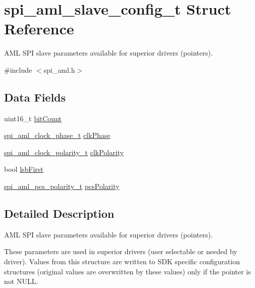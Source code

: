 \hypertarget{structspi__aml__slave__config__t}{}\section{spi\+\_\+aml\+\_\+slave\+\_\+config\+\_\+t Struct Reference}
\label{structspi__aml__slave__config__t}


A\+ML S\+PI slave parameters available for superior drivers (pointers).  




{\ttfamily \#include $<$spi\+\_\+aml.\+h$>$}

\subsection*{Data Fields}
\begin{DoxyCompactItemize}
\item 
uint16\+\_\+t \mbox{\hyperlink{structspi__aml__slave__config__t_afcc9f66e274f7e690549d5d216970d73}{bit\+Count}}
\item 
\mbox{\hyperlink{group__enum__group_gaa95bcc4aa184cc2df42df55e6d8c2d3a}{spi\+\_\+aml\+\_\+clock\+\_\+phase\+\_\+t}} \mbox{\hyperlink{structspi__aml__slave__config__t_a8369385e8658ba5c7a74897397ce0a85}{clk\+Phase}}
\item 
\mbox{\hyperlink{group__enum__group_ga846bf859b73b0a584889013e680bdc5f}{spi\+\_\+aml\+\_\+clock\+\_\+polarity\+\_\+t}} \mbox{\hyperlink{structspi__aml__slave__config__t_a732dd1442ee0b3aa8d353fcd9d84a99f}{clk\+Polarity}}
\item 
bool \mbox{\hyperlink{structspi__aml__slave__config__t_af684ebd7127978006da4f66fd4b1bf9a}{lsb\+First}}
\item 
\mbox{\hyperlink{group__enum__group_ga376ab165389ceb9a6e3f763263ff7e06}{spi\+\_\+aml\+\_\+pcs\+\_\+polarity\+\_\+t}} \mbox{\hyperlink{structspi__aml__slave__config__t_a5ab3ca2262578bfbad4d009e8c12d416}{pcs\+Polarity}}
\end{DoxyCompactItemize}


\subsection{Detailed Description}
A\+ML S\+PI slave parameters available for superior drivers (pointers). 

These parameters are used in superior drivers (user selectable or needed by driver). Values from this structure are written to S\+DK specific configuration structures (original values are overwritten by these values) only if the pointer is not N\+U\+LL. 

